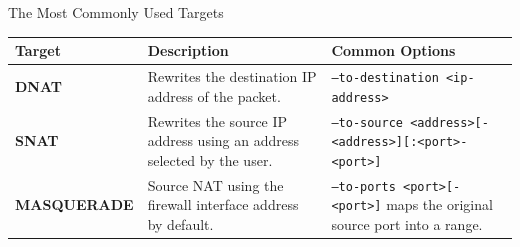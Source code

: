 \begin{frame}{The Most Commonly Used Targets}
\centering\fontsize{10}{12}\selectfont
\renewcommand{\arraystretch}{1.25}
\begin{tabular}{|Y{2.25cm}|Y{4.85cm}|Y{5.3cm}|}\hline
{}\color{white}\bfseries Target&\color{white}\bfseries Description&\color{white}\bfseries Common Options\\\hline
\textcolor{WarningColor}{\bfseries DNAT}&Rewrites the destination IP address of the packet.&\texttt{--to-destination <ip-address>}\\\hline
\textcolor{WarningColor}{\bfseries SNAT}&Rewrites the source IP address using an address selected by the user.&\texttt{--to-source <address>}\newline\texttt{[-<address>][:<port>-<port>]}\\\hline
\textcolor{WarningColor}{\bfseries MASQUERADE}&Source NAT using the firewall interface address by default.&\texttt{--to-ports <port>[-<port>]} maps the original source port into a range.\\\hline
\end{tabular}
\end{frame}
